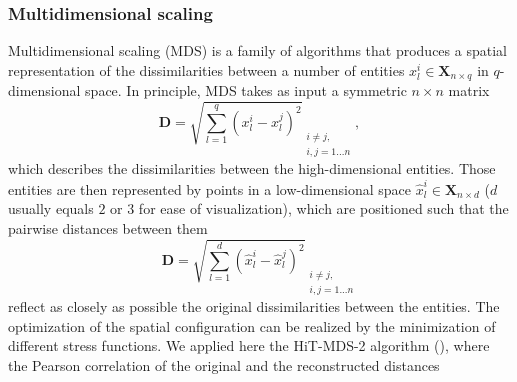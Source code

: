 \subsubsection{Multidimensional scaling}
\label{sec:mds}
Multidimensional scaling (MDS) is a family of algorithms that produces a spatial
representation of the dissimilarities between a number of entities $x_l^i \in 
\boldsymbol{X}_{n \times q}$ in $q$-dimensional space. In 
principle, MDS takes as input a symmetric $n \times n$ matrix 
\begin{equation}
  \boldsymbol{D} = \sqrt{\sum_{l=1}^q (x_l^i - x_l^j)^2}_{\substack{i \neq j,\\
    i,j=1...n}},
\end{equation}
which
describes the dissimilarities between the high-dimensional
entities. Those entities
are then represented by points in a low-dimensional space $\hat{x}_l^i \in 
\hat{\boldsymbol{X}}_{n \times d}$ ($d$ usually equals $2$ or
$3$ for ease of visualization), which are positioned
such that the pairwise distances between them 
\begin{equation}
  \hat{\boldsymbol{D}} = \sqrt{\sum_{l=1}^d (\hat{x}_l^i - \hat{x}_l^j)^2}_{\substack{
    i \neq j,\\i,j=1...n}}
\end{equation}
reflect as closely as possible  
the original
dissimilarities between the entities. 
The optimization of the spatial configuration can be realized by the 
minimization of different stress functions.
We applied
here the HiT-MDS-2 algorithm (\citealp{Strickert2009}), where the
Pearson correlation of the original and the reconstructed distances 


